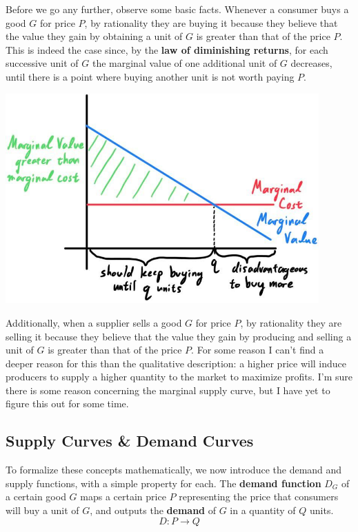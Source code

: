 \documentclass{article}
\begin{document}
    Before we go any further, observe some basic facts. Whenever a consumer buys a good $G$ for price $P$, by rationality they are buying it because they believe that the value they gain by obtaining a unit of $G$ is greater than that of the price $P$. This is indeed the case since, by the \textbf{law of diminishing returns}, for each successive unit of $G$ the marginal value of one additional unit of $G$ decreases, until there is a point where buying another unit is not worth paying $P$.
    \begin{center}
      \includegraphics[width=0.9\textwidth]{img/Marginal_Value.jpg}
    \end{center}

    Additionally, when a supplier sells a good $G$ for price $P$, by rationality they are selling it because they believe that the value they gain by producing and selling a unit of $G$ is greater than that of the price $P$. For some reason I can't find a deeper reason for this than the qualitative description: a higher price will induce producers to supply a higher quantity to the market to maximize profits. I'm sure there is some reason concerning the marginal supply curve, but I have yet to figure this out for some time.

  \subsection{Supply Curves \& Demand Curves}

    To formalize these concepts mathematically, we now introduce the demand and supply functions, with a simple property for each. The \textbf{demand function} $D_G$ of a certain good $G$ maps a certain price $P$ representing the price that consumers will buy a unit of $G$, and outputs the \textbf{demand} of $G$ in a quantity of $Q$ units.
    \begin{equation}
      D: P \longrightarrow Q
    \end{equation}
\end{document}
